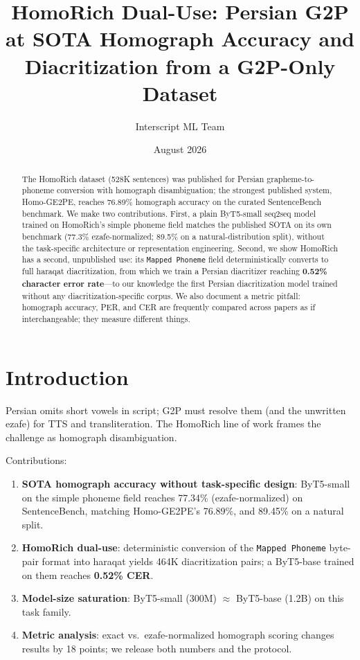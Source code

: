 \documentclass[11pt]{article}
\title{HomoRich Dual-Use: Persian G2P at SOTA Homograph Accuracy and\\ Diacritization from a G2P-Only Dataset}
\author{Interscript ML Team}
\date{August 2026}
\begin{document}
\maketitle

\begin{abstract}
The HomoRich dataset (528K sentences) was published for Persian
grapheme-to-phoneme conversion with homograph disambiguation; the strongest
published system, Homo-GE2PE, reaches 76.89\% homograph accuracy on the
curated SentenceBench benchmark. We make two contributions. First, a plain
ByT5-small seq2seq model trained on HomoRich's simple phoneme field matches
the published SOTA on its own benchmark (77.3\% ezafe-normalized; 89.5\% on
a natural-distribution split), without the task-specific architecture or
representation engineering. Second, we show HomoRich has a second,
unpublished use: its \texttt{Mapped Phoneme} field deterministically
converts to full haraqat diacritization, from which we train a Persian
diacritizer reaching \textbf{0.52\% character error rate}---to our
knowledge the first Persian diacritization model trained without any
diacritization-specific corpus. We also document a metric pitfall:
homograph accuracy, PER, and CER are frequently compared across papers as
if interchangeable; they measure different things.
\end{abstract}

\section{Introduction}
Persian omits short vowels in script; G2P must resolve them (and the
unwritten ezafe) for TTS and transliteration. The HomoRich line of work
\cite{homorich} frames the challenge as homograph disambiguation.

Contributions:
\begin{enumerate}
  \item \textbf{SOTA homograph accuracy without task-specific design}:
        ByT5-small on the simple phoneme field reaches 77.34\%
        (ezafe-normalized) on SentenceBench, matching Homo-GE2PE's
        76.89\%, and 89.45\% on a natural split.
  \item \textbf{HomoRich dual-use}: deterministic conversion of the
        \texttt{Mapped Phoneme} byte-pair format into haraqat yields
        464K diacritization pairs; a ByT5-base trained on them reaches
        \textbf{0.52\% CER}.
  \item \textbf{Model-size saturation}: ByT5-small (300M) $\approx$
        ByT5-base (1.2B) on this task family.
  \item \textbf{Metric analysis}: exact vs.\ ezafe-normalized homograph
        scoring changes results by 18 points; we release both numbers and
        the protocol.
\end{enumerate}
\end{document}
